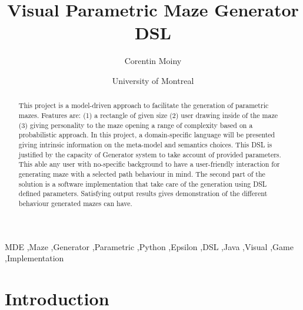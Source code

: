 \documentclass[review]{elsarticle}
\begin{document}
\begin{frontmatter}

\title{Visual Parametric Maze Generator DSL }

\author{Corentin Moiny}
\address{304, 5e Avenue Mailloux, La Pocatière. Quebec. Canada}

\author[mymainaddress]{University of Montreal}

\address[mymainaddress]{2900 Edouard Montpetit Blvd, Montreal, Quebec. Canada}

\begin{abstract}
This project is a model-driven approach to facilitate the generation of parametric mazes. Features are: (1) a rectangle of given size (2) user drawing inside of the maze (3) giving personality to the maze opening a range of complexity based on a probabilistic approach. In this project, a domain-specific language will be presented giving intrinsic information on the meta-model and semantics choices. This DSL is justified by the capacity of Generator system to take account of provided parameters. This able any user with no-specific background to have a user-friendly interaction for generating maze with a selected path behaviour in mind. The second part of the solution is a software implementation that take care of the generation using DSL defined parameters. Satisfying output results gives demonstration of the different behaviour generated mazes can have.
\end{abstract}

\begin{keyword}
MDE \sep Maze \sep Generator \sep Parametric \sep Python \sep Epsilon \sep DSL \sep Java \sep Visual \sep Game \sep Implementation
\end{keyword}

\end{frontmatter}

\linenumbers

\section{Introduction}
\end{document}
